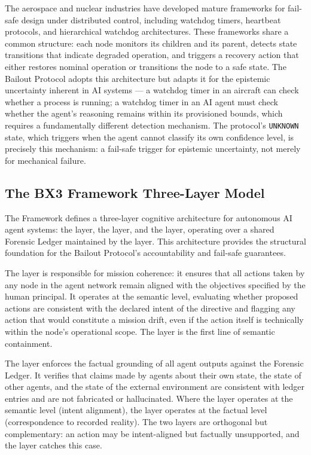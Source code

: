 The aerospace and nuclear industries have developed mature frameworks for fail-safe design under distributed control, including watchdog timers, heartbeat protocols, and hierarchical watchdog architectures. These frameworks share a common structure: each node monitors its children and its parent, detects state transitions that indicate degraded operation, and triggers a recovery action that either restores nominal operation or transitions the node to a safe state. The Bailout Protocol adopts this architecture but adapts it for the epistemic uncertainty inherent in AI systems — a watchdog timer in an aircraft can check whether a process is running; a watchdog timer in an AI agent must check whether the agent's reasoning remains within its provisioned bounds, which requires a fundamentally different detection mechanism. The protocol's \texttt{UNKNOWN} state, which triggers when the agent cannot classify its own confidence level, is precisely this mechanism: a fail-safe trigger for epistemic uncertainty, not merely for mechanical failure.

\subsection{The BX3 Framework Three-Layer Model}
\label{sec:bx3-model}

The \bxthree{} Framework defines a three-layer cognitive architecture for autonomous AI agent systems: the \purpose{} layer, the \truth{} layer, and the \bounds{} layer, operating over a shared Forensic Ledger maintained by the \fact{} layer. This architecture provides the structural foundation for the Bailout Protocol's accountability and fail-safe guarantees.

The \purpose{} layer is responsible for mission coherence: it ensures that all actions taken by any node in the agent network remain aligned with the objectives specified by the human principal. It operates at the semantic level, evaluating whether proposed actions are consistent with the declared intent of the directive and flagging any action that would constitute a mission drift, even if the action itself is technically within the node's operational scope. The \purpose{} layer is the first line of semantic containment.

The \truth{} layer enforces the factual grounding of all agent outputs against the Forensic Ledger. It verifies that claims made by agents about their own state, the state of other agents, and the state of the external environment are consistent with ledger entries and are not fabricated or hallucinated. Where the \purpose{} layer operates at the semantic level (intent alignment), the \truth{} layer operates at the factual level (correspondence to recorded reality). The two layers are orthogonal but complementary: an action may be intent-aligned but factually unsupported, and the \truth{} layer catches this case.

